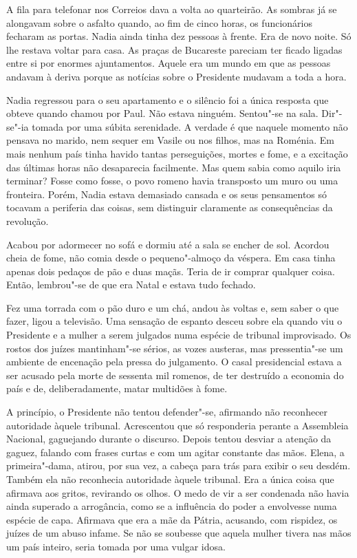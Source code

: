 \bigskip

A fila para telefonar nos Correios dava a volta ao quarteirão. As
sombras já se alongavam sobre o asfalto quando, ao fim de cinco horas,
os funcionários fecharam as portas. Nadia ainda tinha dez pessoas à
frente. Era de novo noite. Só lhe restava voltar para casa. As praças de
Bucareste pareciam ter ficado ligadas entre si por enormes ajuntamentos. Aquele era um mundo em que as pessoas andavam à deriva porque as
notícias sobre o Presidente mudavam a toda a hora.

Nadia regressou para o seu apartamento e o silêncio foi a única resposta
que obteve quando chamou por Paul. Não estava ninguém. Sentou"-se na
sala. Dir"-se"-ia tomada por uma súbita serenidade. A verdade é que
naquele momento não pensava no marido, nem sequer em Vasile ou nos
filhos, mas na Roménia. Em mais nenhum país tinha havido tantas
perseguições, mortes e fome, e a excitação das últimas horas não
desaparecia facilmente. Mas quem sabia como aquilo iria terminar? Fosse
como fosse, o povo romeno havia transposto um muro ou uma fronteira.
Porém, Nadia estava demasiado cansada e os seus pensamentos só tocavam a
periferia das coisas, sem distinguir claramente as consequências da
revolução.

Acabou por adormecer no sofá e dormiu até a sala se
encher de sol. Acordou cheia de fome, não comia desde o pequeno"-almoço
da véspera. Em casa tinha apenas dois
pedaços de pão e duas maçãs. Teria de ir comprar qualquer coisa. Então,
lembrou"-se de que era Natal e estava tudo fechado.

Fez uma torrada com o pão duro e um chá, andou às voltas e, sem saber o
que fazer, ligou a televisão. Uma sensação de espanto desceu sobre ela
quando viu o Presidente e a mulher a serem julgados numa espécie de
tribunal improvisado. Os rostos dos juízes mantinham"-se sérios, as
vozes austeras, mas pressentia"-se um ambiente de encenação pela pressa
do julgamento. O casal presidencial estava a ser acusado pela morte de
sessenta mil romenos, de ter destruído a economia do país e de,
deliberadamente, matar multidões à fome.
	
A princípio, o Presidente não tentou defender"-se, afirmando não
reconhecer autoridade àquele tribunal. Acrescentou que só responderia
perante a Assembleia Nacional, gaguejando durante o discurso. Depois
tentou desviar a atenção da gaguez, falando com frases curtas e com um
agitar constante das mãos. Elena, a primeira"-dama, atirou, por sua vez,
a cabeça para trás para exibir o seu desdém. Também ela não reconhecia
autoridade àquele tribunal. Era a única coisa que afirmava aos gritos,
revirando os olhos. O medo de vir a ser condenada não havia ainda
superado a arrogância, como se a influência do poder a envolvesse numa
espécie de capa. Afirmava que era a mãe da Pátria, acusando, com
rispidez, os juízes de um abuso infame. Se não se soubesse que aquela
mulher tivera nas mãos um país inteiro, seria tomada por uma vulgar
idosa.

